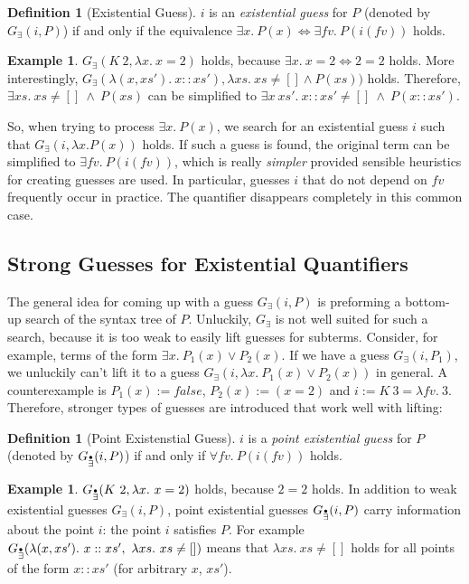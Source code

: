 \documentclass[a4paper,12pt,DIV=12,oneside]{scrbook}
\newcommand{\fv}{\textit{fv}}
\theoremstyle{definition}
\newtheorem{definition}[lemma]{Definition}
\newtheorem{example}[lemma]{Example}
\theoremstyle{remark}
\newcommand{\GE}{\ensuremath{G_\exists}}
\newcommand{\GEP}{\ensuremath{G_{\accentset{\bullet}{\exists}}}}
\begin{document}
\begin{definition}[Existential Guess]
  $i$ is an \emph{existential guess} for $P$ (denoted by $\GE(i, P)$)
  if and only if the equivalence $\exists x.\ P(x) \Longleftrightarrow
  \exists \fv.\ P(i(\fv))$ holds.
\end{definition}

\begin{example}
$\GE(K\ 2, \lambda x.\ x = 2)$ holds, because $\exists x.\ x = 2
\Longleftrightarrow 2 = 2$ holds. More interestingly,
$\GE(\lambda(x, xs').\ x::xs'), \lambda xs.\ xs \neq [] \wedge P(xs))$
holds. Therefore, $\exists xs.\ xs \neq []\ \wedge\ P(xs)$ can be simplified
to $\exists x\ xs'.\ x::xs' \neq []\ \wedge\ P(x::xs')$. 
\end{example}

So, when trying to process $\exists x.\ P(x)$, we search
for an existential guess $i$ such that $\GE(i, \lambda x. P(x))$
holds. If such a guess is found, the original term can be simplified to
$\exists \fv.\ P(i(\fv))$, which is really \emph{simpler} provided sensible heuristics for creating
guesses are used. In particular, guesses $i$ that do not depend on $\fv$ frequently occur in practice. 
The quantifier disappears completely in this common case.

\subsection{Strong Guesses for Existential Quantifiers}

The general idea for coming up with a guess $\GE(i, P)$ is preforming 
a bottom-up search of the syntax tree of $P$. Unluckily, $\GE$ is
not well suited for such a search, because it is too weak to easily lift 
guesses for subterms. Consider, for example, terms of the form 
$\exists x.\ P_1(x) \vee P_2(x)$. If we have a guess $\GE(i, P_1)$, we unluckily can't lift it
to a guess $\GE(i, \lambda x.\ P_1(x) \vee P_2(x))$ in general. A counterexample
is $P_1(x) := \textit{false}$, $P_2(x) := (x = 2)$ and $i := K\ 3 = \lambda \fv.\ 3$.
Therefore, stronger types of guesses are introduced that work well with lifting:

\begin{definition}[Point Existenstial Guess]
$i$ is a \emph{point existential guess} for $P$ (denoted by $\GEP(i, P)$) if and only if $\forall \fv.\ P(i(\fv))$ holds.
\end{definition}

\begin{example}
  $\GEP(K\ 2, \lambda x.\ x=2)$ holds, because $2=2$ holds. In
  addition to weak existential guesses $\GE(i,P)$, point existential
  guesses $\GEP(i,P)$ carry information about the point $i$: the point
  $i$ satisfies $P$. For example $\GEP(\lambda (x,xs').\ x::xs',\ \lambda
  xs.\ xs \neq [])$ means that $\lambda xs.\ xs \neq []$ holds for all
  points of the form $x :: xs'$ (for arbitrary $x$, $xs'$).
\end{example}
\end{document}
